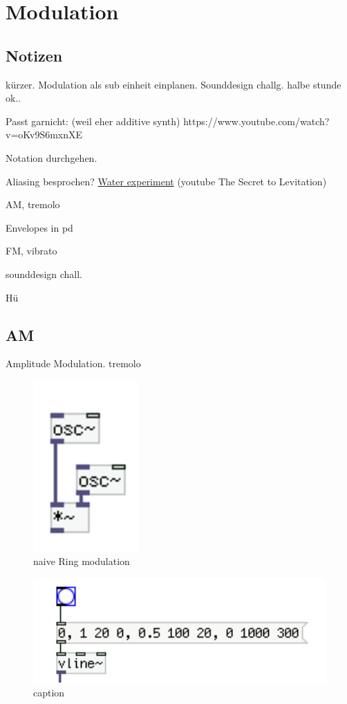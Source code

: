 \chapter{Modulation}
\label{Modulation}

\section{Notizen}

kürzer. Modulation als sub einheit einplanen.
Sounddesign challg. halbe stunde ok..

Passt garnicht: (weil eher additive synth)
https://www.youtube.com/watch?v=oKv9S6mxnXE


Notation durchgehen.

Aliasing besprochen?
\href{https://www.youtube.com/watch?v=GBtHeR-hY9Y}{Water experiment}
(youtube \glqq{}The Secret to Levitation\grqq{})

AM, tremolo

Envelopes in pd

FM, vibrato

sounddesign chall.

Hü


\section{AM} %
\label{sub:AM}

Amplitude Modulation. \glqq{}tremolo\grqq{}


\begin{figure}[H]
	\begin{center}
		\includegraphics[width = 4cm]{img/ringNaive.png}
		\caption{naive Ring modulation}
		\label{fig:name}
	\end{center}
\end{figure}


\begin{figure}[H]
	\begin{center}
		\includegraphics[width = 14cm]{img/simpleEnv.png}
		\caption{caption}
		\label{fig:name}
	\end{center}
\end{figure}

